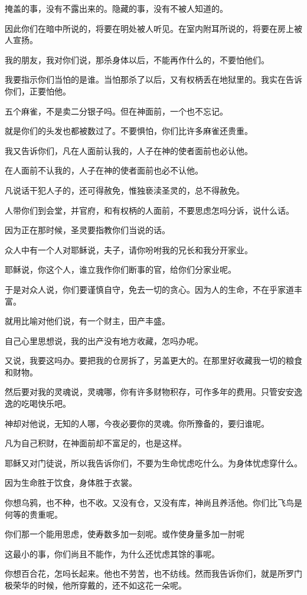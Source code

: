 \documentclass[12pt,oneside]{book}
\begin{document}
掩盖的事，没有不露出来的。隐藏的事，没有不被人知道的。

因此你们在暗中所说的，将要在明处被人听见。在室内附耳所说的，将要在房上被人宣扬。

我的朋友，我对你们说，那杀身体以后，不能再作什么的，不要怕他们。

我要指示你们当怕的是谁。当怕那杀了以后，又有权柄丢在地狱里的。我实在告诉你们，正要怕他。

五个麻雀，不是卖二分银子吗。但在神面前，一个也不忘记。

就是你们的头发也都被数过了。不要惧怕，你们比许多麻雀还贵重。

我又告诉你们，凡在人面前认我的，人子在神的使者面前也必认他。

在人面前不认我的，人子在神的使者面前也必不认他。

凡说话干犯人子的，还可得赦免，惟独亵渎圣灵的，总不得赦免。

人带你们到会堂，并官府，和有权柄的人面前，不要思虑怎吗分诉，说什么话。

因为正在那时候，圣灵要指教你们当说的话。

众人中有一个人对耶稣说，夫子，请你吩咐我的兄长和我分开家业。

耶稣说，你这个人，谁立我作你们断事的官，给你们分家业呢。

于是对众人说，你们要谨慎自守，免去一切的贪心。因为人的生命，不在乎家道丰富。

就用比喻对他们说，有一个财主，田产丰盛。

自己心里思想说，我的出产没有地方收藏，怎吗办呢。

又说，我要这吗办。要把我的仓房拆了，另盖更大的。在那里好收藏我一切的粮食和财物。

然后要对我的灵魂说，灵魂哪，你有许多财物积存，可作多年的费用。只管安安逸逸的吃喝快乐吧。

神却对他说，无知的人哪，今夜必要你的灵魂。你所豫备的，要归谁呢。

凡为自己积财，在神面前却不富足的，也是这样。

耶稣又对门徒说，所以我告诉你们，不要为生命忧虑吃什么。为身体忧虑穿什么。

因为生命胜于饮食，身体胜于衣裳。

你想乌鸦，也不种，也不收。又没有仓，又没有库，神尚且养活他。你们比飞鸟是何等的贵重呢。

你们那一个能用思虑，使寿数多加一刻呢。或作使身量多加一肘呢

这最小的事，你们尚且不能作，为什么还忧虑其馀的事呢。

你想百合花，怎吗长起来。他也不劳苦，也不纺线。然而我告诉你们，就是所罗门极荣华的时候，他所穿戴的，还不如这花一朵呢。
\end{document}

